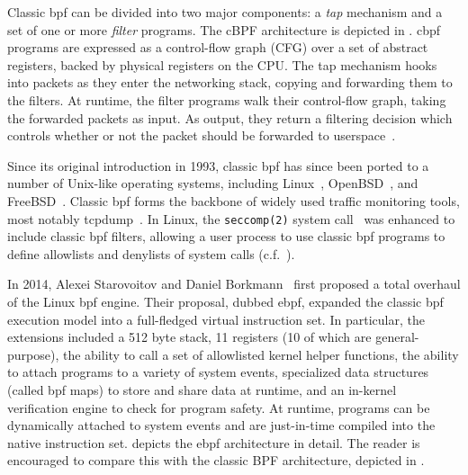 Classic \gls{bpf} can be divided into two major components: a \textit{tap} mechanism and a set
of one or more \textit{filter} programs. The cBPF architecture is depicted in
. \gls{cbpf} programs are expressed as a control-flow graph (CFG)
over a set of abstract registers, backed by physical registers on the CPU. The tap
mechanism hooks into packets as they enter the networking stack, copying and forwarding
them to the filters. At runtime, the filter programs walk their control-flow graph, taking
the forwarded packets as input. As output, they return a filtering decision which controls
whether or not the packet should be forwarded to userspace~\cite{mccanne1993_bpf}.

Since its original introduction in 1993, classic \gls{bpf} has since been ported to
a number of Unix-like operating systems, including Linux~\cite{linux_bpf},
OpenBSD~\cite{openbsd_bpf}, and FreeBSD~\cite{freebsd_bpf}. Classic \gls{bpf} forms the
backbone of widely used traffic monitoring tools, most notably tcpdump~\cite{tcpdump,
mccanne1993_bpf}. In Linux, the \texttt{seccomp(2)} system
call~\cite{anderson2017_comparison} was enhanced to include classic \gls{bpf} filters,
allowing a user process to use classic \gls{bpf} programs to define allowlists and
denylists of system calls (c.f.~).


In 2014, Alexei Starovoitov and Daniel Borkmann~\cite{starovoitov2014_ebpf} first proposed
a total overhaul of the Linux \gls{bpf} engine. Their proposal, dubbed \gls{ebpf}, expanded the
classic \gls{bpf} execution model into a full-fledged virtual instruction set. In particular,
the extensions included a 512 byte stack, 11 registers (10 of which are general-purpose),
the ability to call a set of allowlisted kernel helper functions, the ability to attach
programs to a variety of system events, specialized data structures (called \gls{bpf} maps) to
store and share data at runtime, and an in-kernel verification engine to check for program
safety. At runtime, programs can be dynamically attached to system events and are
just-in-time compiled into the native instruction set.   depicts
the \gls{ebpf} architecture in detail. The reader is encouraged to compare this with the classic
BPF architecture, depicted in .

